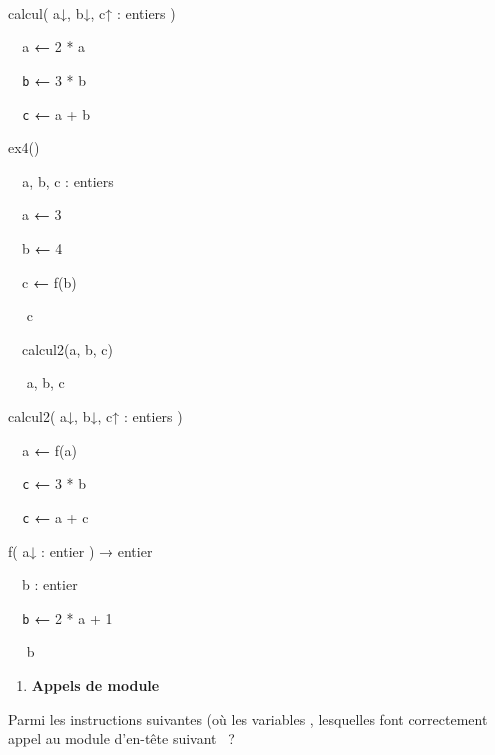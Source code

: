 {\sffamily
{}\ \ }


\bigskip

{\sffamily
{} calcul{(
a}{↓}{,
b}{↓}{,
c}{↑ :}{ entiers )}}

{\sffamily
\texttt{\ \ }a {\textbf{←}} 2 * a}

{\sffamily
\texttt{\ \ b} {\textbf{←}} 3 * b}

{\sffamily
\texttt{\ \ c} {\textbf{←}} a + b}

{\sffamily
{}}


\bigskip

{\sffamily
{} ex4()}

{\sffamily
{\texttt{\ \ }}{a, b, c
: entiers\ \ \ \ \ \ }}

{\sffamily
{\ \ }a {\textbf{←}} 3}

{\sffamily
\ \ b {\textbf{←}} 4\ \ }

{\sffamily
\ \ {c
}{\textbf{←}}{
f(b)\ \ \ \ \ \ }}

{\sffamily
\ \  c}

{\sffamily
\ \ calcul2(a, b, c)\ \ \ \ }

{\sffamily
\ \  a, b, c}

{\sffamily
{}}


\bigskip

{\sffamily
{} calcul2{(
a}{↓}{,
b}{↓}{,
c}{↑ :}{ entiers )}}

{\sffamily
\texttt{\ \ }a {\textbf{←}} f(a)}

{\sffamily
\texttt{\ \ c} {\textbf{←}} 3 * b}

{\sffamily
\texttt{\ \ c} {\textbf{←}} a + c}

{\sffamily
{}}


\bigskip

{\sffamily
{} f{(
a}{↓ :}{ entier )
}{→}{ entier}}

{\sffamily
\ \ b : entier}

{\sffamily
\texttt{\ \ b} {\textbf{←}} 2 * a + 1}

{\sffamily
\ \  b}

{\sffamily
{}}


\bigskip

\liststyleExercice
\setcounter{saveenum}{\value{enumi}}
\begin{enumerate}
\setcounter{enumi}{\value{saveenum}}
\item {\sffamily\bfseries
Appels de module}
\end{enumerate}
{
Parmi les instructions suivantes {(où les
variables
}, lesquelles font correctement appel au module
d’en-tête suivant
{\textsf{\ }}{?}}

